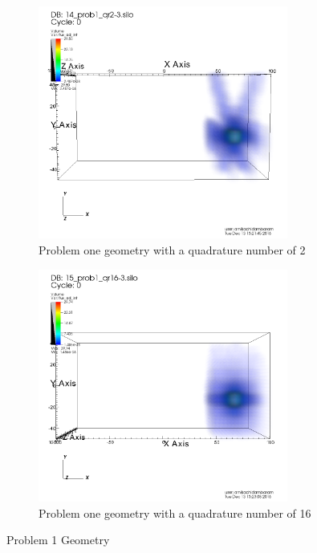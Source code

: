 \documentclass[10pt]{article}
\begin{document}
\begin{figure}[!ht]
\centering
\begin{subfigure}{0.49\textwidth}
\centering
\includegraphics[width = 0.9\textwidth]{visit/visit-prob_1-02.png}
\caption{Problem one geometry with a quadrature number of 2}
\label{visit:prob_1-02}
\end{subfigure}
\hfill
\begin{subfigure}{0.49\textwidth}
\centering
\includegraphics[width = 0.9\textwidth]{visit/visit-prob_1-16.png}
\caption{Problem one geometry with a quadrature number of 16}
\label{visit:prob_1-16}
\end{subfigure}
\caption{Problem 1 Geometry}
\label{visit:prob_1}
\end{figure}
\end{document}
